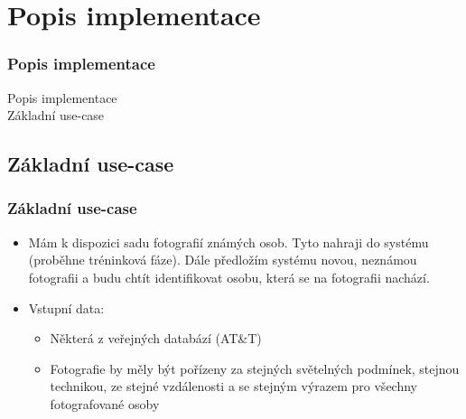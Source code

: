 \documentclass{beamer}
\begin{document}
\section{Popis implementace}
\begin{frame}

\begin{center}
\frametitle{Popis implementace}
	\huge Popis implementace\\[1.5cm]
	\large Základní use-case
\end{center}

\end{frame}

\subsection{Základní use-case}
\begin{frame}
\frametitle{Základní use-case}
\begin{itemize}
	\item Mám k dispozici sadu fotografií známých osob. Tyto nahraji do systému (proběhne tréninková fáze). Dále předložím systému novou, neznámou fotografii a budu chtít identifikovat osobu, která se na fotografii nachází.
	\item Vstupní data:
		\begin{itemize}
			\item Některá z veřejných databází (AT\&T)
			\item Fotografie by měly být pořízeny za stejných světelných podmínek, stejnou technikou, ze stejné vzdálenosti a se stejným výrazem pro všechny fotografované osoby
		\end{itemize}
\end{itemize}
\end{frame}
\end{document}
